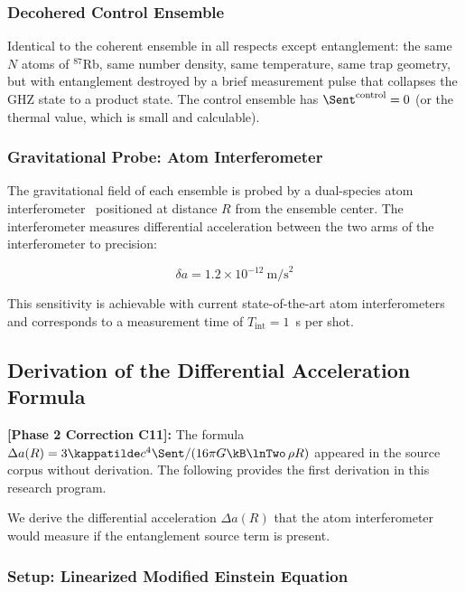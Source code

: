\subsubsection{Decohered Control Ensemble}

Identical to the coherent ensemble in all respects except entanglement:
the same $N$ atoms of $^{87}$Rb, same number density, same temperature,
same trap geometry, but with entanglement destroyed by a brief measurement
pulse that collapses the GHZ state to a product state. The control ensemble
has $\Sent^{\mathrm{control}} = 0$ (or the thermal value, which is small
and calculable).

\subsubsection{Gravitational Probe: Atom Interferometer}

The gravitational field of each ensemble is probed by a dual-species atom
interferometer~\cite{kasevich2023} positioned at distance $R$ from the
ensemble center. The interferometer measures differential acceleration
between the two arms of the interferometer to precision:

\begin{equation}
    \delta a = 1.2\times10^{-12}~\mathrm{m/s}^2
    \label{eq:sensitivity}
\end{equation}

\noindent This sensitivity is achievable with current state-of-the-art
atom interferometers and corresponds to a measurement time of
$T_{\mathrm{int}} = 1$~s per shot.

\subsection{Derivation of the Differential Acceleration Formula}
\label{subsec:derivation_delta_a}

\begin{framed}
\noindent\textbf{[Phase 2 Correction C11]:} The formula
$\Delta a(R) = 3\kappatilde c^4 \Sent/(16\pi G\kB\lnTwo\,\rho R)$
appeared in the source corpus without derivation. The following
provides the first derivation in this research program.
\end{framed}

We derive the differential acceleration $\Delta a(R)$ that the atom
interferometer would measure if the entanglement source term is present.

\subsubsection{Setup: Linearized Modified Einstein Equation}

